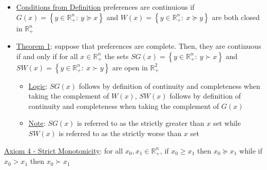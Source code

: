 \documentclass{article}
\begin{document}
  \begin{itemize}
    \item  \underline{Conditions from Definition} preferences are continuious if $G(x) = \left\{ y \in \mathbb{R}_{+}^{n}: \ y \succeq x \right\}$ and $W(x) = \left\{ y \in \mathbb{R}_{+}^{n}: \ x \succeq y \right\}$ are both closed in $\mathbb{R}_{+}^{n}$
    \item  \underline{Theorem 1}: suppose that preferences are complete. Then, they are continuous if and only if for all $x \in \mathbb{R}_{+}^{n}$ the sets $SG(x) = \left\{ y \in \mathbb{R}_{+}^{n}: \ y \succ x \right\}$ and $SW(x) = \left\{ y \in \mathbb{R}_{+}^{n}: \ x \succ y \right\}$ are open in $\mathbb{R}_{+}^{2}$
    \begin{itemize}
      \item  \underline{Logic}: $SG(x)$ follows by definition of continuity and completeness when taking the complement of $W(x)$, $SW(x)$ follows by definition of continuity and completeness when taking the complement of $G(x)$
      \item  \underline{Note}: $SG(x)$ is referred to as the strictly greater than $x$ set while $SW(x)$ is referred to as the strictly worse than $x$ set
    \end{itemize}
  \end{itemize}
  \par
  \underline{Axiom 4 - Strict Monotonicity}: for all $x_{0}, x_{1} \in \mathbb{R}_{+}^{n}$, if $x_{0} \geq x_{1}$ then $x_{0} \succeq x_{1}$ while if $x_{0} > x_{1}$ then $x_{0} \succ x_{1}$
\end{document}
